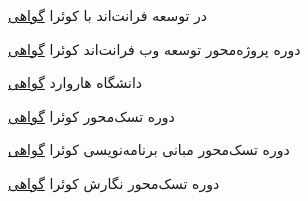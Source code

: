 
\begin{cvhonors}
  \cvhonor
    { در توسعه فرانت‌اند با }
    {کوئرا}
    {\href{https://quera.org/certificate/1TyQm8RV/}{گواهی}}
    {} %

  \cvhonor
    {دوره پروژه‌محور توسعه وب فرانت‌اند}
    {کوئرا}
    {\href{https://quera.org/certificate/Z4shbXOc/}{گواهی}}
    {}

  \cvhonor
    {}
    {دانشگاه هاروارد}
    {\href{https://certificates.cs50.io/732f87e9-6550-444e-8ad6-99922c3aca9c.pdf}{گواهی}}
    {}

  \cvhonor
    {دوره تسک‌محور }
    {کوئرا}
    {\href{https://quera.org/certificate/oBvP6gms/}{گواهی}}
    {}

  \cvhonor
    {دوره تسک‌محور مبانی برنامه‌نویسی }
    {کوئرا}
    {\href{https://quera.org/certificate/33b4vSHp/}{گواهی}}
    {}

  \cvhonor
    {دوره تسک‌محور نگارش }
    {کوئرا}
    {\href{https://quera.org/certificate/3CfoovY6/}{گواهی}}
    {}

\end{cvhonors}
